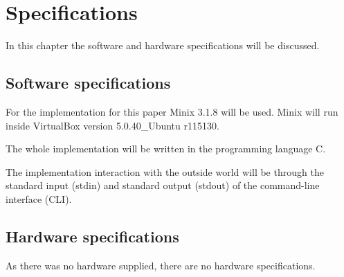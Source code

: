 \hypertarget{specifications}{%
\section{Specifications}\label{specifications}}

In this chapter the software and hardware specifications will be
discussed.

\hypertarget{software-specifications}{%
\subsection{Software specifications}\label{software-specifications}}

For the implementation for this paper Minix 3.1.8 will be used. Minix
will run inside VirtualBox version 5.0.40\_Ubuntu r115130.

The whole implementation will be written in the programming language C.

The implementation interaction with the outside world will be through
the standard input (stdin) and standard output (stdout) of the
command-line interface (CLI).

\hypertarget{hardware-specifications}{%
\subsection{Hardware specifications}\label{hardware-specifications}}

As there was no hardware supplied, there are no hardware specifications.
